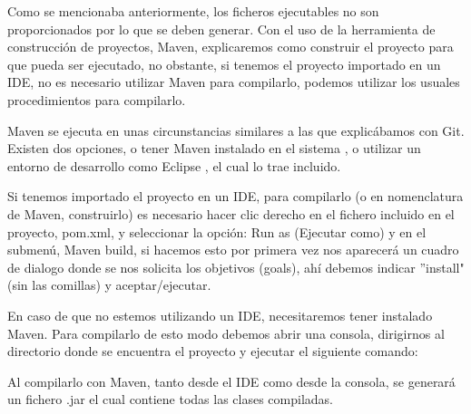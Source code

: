Como se mencionaba anteriormente, los ficheros ejecutables no son proporcionados por lo que se deben generar. Con el uso de la herramienta de construcción de proyectos, Maven, explicaremos como construir el proyecto para que pueda ser ejecutado, no obstante, si tenemos el proyecto importado en un IDE, no es necesario utilizar Maven para compilarlo, podemos utilizar los usuales procedimientos para compilarlo.


Maven se ejecuta en unas circunstancias similares a las que explicábamos con Git. Existen dos opciones, o tener Maven instalado en el sistema \cite{instalacion_maven}, o utilizar un entorno de desarrollo como Eclipse \cite{eclipse}, el cual lo trae incluido. 

Si tenemos importado el proyecto en un IDE, para compilarlo (o en nomenclatura de Maven, construirlo) es necesario hacer clic derecho en el fichero incluido en el proyecto, pom.xml, y seleccionar la opción: Run as (Ejecutar como) y en el submen\'u, Maven build, si hacemos esto por primera vez nos aparecerá un cuadro de dialogo donde se nos solicita los objetivos (goals), ah\'i debemos indicar ''install" (sin las comillas) y aceptar/ejecutar. 

En caso de que no estemos utilizando un IDE, necesitaremos tener instalado Maven. Para compilarlo de esto modo debemos abrir una consola, dirigirnos al directorio donde se encuentra el proyecto y ejecutar el siguiente comando:


Al compilarlo con Maven, tanto desde el IDE como desde la consola, se generar\'a un fichero .jar el cual contiene todas las clases compiladas.